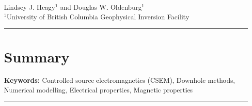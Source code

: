 \documentclass[10pt,pdftex,fleqn]{article}
\begin{document}
\thispagestyle{fancyfirst}
\begin{center}
\end{center}


\begin{center}
Lindsey J. Heagy$^1$ and Douglas W. Oldenburg$^1$ \\
$^1$University of British Columbia Geophysical Inversion Facility \\
\end{center}
\rule{\textwidth}{0.4pt}
\section{Summary}



{\bfseries Keywords:} Controlled source electromagnetics (CSEM), Downhole methods, Numerical modelling, Electrical properties, Magnetic properties


\rule{\textwidth}{0.4pt}

\begin{multicols*}{2}










\renewcommand\refname{\uppercase{References}} %

\end{multicols*}
\end{document}

